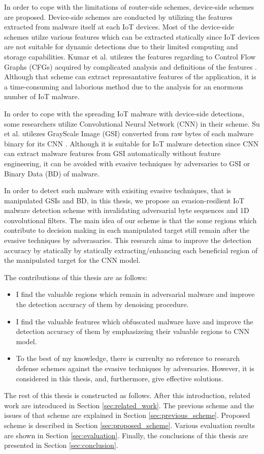 In order to cope with the limitations of router-side schemes, device-side schemes are proposed.
Device-side schemes are conducted by utilizing the features extracted from malware itself at each IoT devices.
Most of the device-side schemes utilze various features which can be extracted statically since IoT devices are not suitable for dynamic detections due to their limited computing and storage capabilities.
Kumar et al. utilezes the features regarding to Control Flow Graphs (CFGs) acquired by complicated analysis and definitions of the features \cite{cfg}.
Although that scheme can extract represantative features of the application, it is a time-consuming and laborious method due to the analysis for an enormous number of IoT malware.

In order to cope with the spreading IoT malware with device-side detections, some researchers utilize Convolutional Neural Network (CNN) in their scheme.
Su et al. utilezes GrayScale Image (GSI) converted from raw bytes of each malware binary for its CNN \cite{previous}.
Although it is suitable for IoT malware detection since CNN can extract malware features from GSI automatically without feature engineering, it can be avoided with evasive techniques by adversaries to GSI or Binary Data (BD) of malware. 

In order to detect such malware with exisiting evasive techniques, that is manipulated GSIs and BD, in this thesis, we propose an evasion-resilient IoT malware detection scheme with invalidating adversarial byte sequences and 1D convolutional filters.
The main idea of our scheme is that the some regions which contribute to decision making in each manipulated target still remain after the evasive techniques by adverasaries. 
This research aims to improve the detection accuracy by statically by statically extracting/enhancing each beneficial region of the manipulated target for the CNN model.

The contributions of this thesis are as follows: 
\begin{itemize}
 \item I find the valuable regions which remain in adversarial malware and improve the detection accuracy of them by denoising procedure.
 \item I find the valuable features which obfuscated malware have and improve the detection accuracy of them by emphasizeing their valuable regions to CNN model.
 \item To the best of my knowledge, there is currenlty no reference to research defense schemes against the evasive techniques by adversaries. However, it is considered in this thesis, and, furthermore, give effective solutions.
\end{itemize}

The rest of this thesis is constructed as follows. 
After this introduction, related work are introduced in Section \ref{sec:related_work}.
The previous scheme and the issues of that scheme are explained in Section \ref{sec:previous_scheme}.
Proposed scheme is described in Section \ref{sec:proposed_scheme}.
Various evaluation results are shown in Section \ref{sec:evaluation}.
Finally, the conclusions of this thesis are presented in Section \ref{sec:conclusion}.

